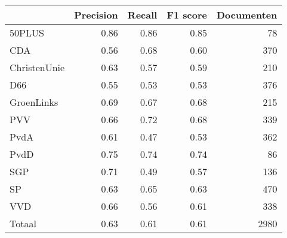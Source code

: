 \begin{tabular}{lrrrr}
\toprule
{} &  Precision &  Recall &  F1 score &  Documenten \\
\midrule
50PLUS       &       0.86 &    0.86 &      0.85 &          78 \\
CDA          &       0.56 &    0.68 &      0.60 &         370 \\
ChristenUnie &       0.63 &    0.57 &      0.59 &         210 \\
D66          &       0.55 &    0.53 &      0.53 &         376 \\
GroenLinks   &       0.69 &    0.67 &      0.68 &         215 \\
PVV          &       0.66 &    0.72 &      0.68 &         339 \\
PvdA         &       0.61 &    0.47 &      0.53 &         362 \\
PvdD         &       0.75 &    0.74 &      0.74 &          86 \\
SGP          &       0.71 &    0.49 &      0.57 &         136 \\
SP           &       0.63 &    0.65 &      0.63 &         470 \\
VVD          &       0.66 &    0.56 &      0.61 &         338 \\
Totaal       &       0.63 &    0.61 &      0.61 &        2980 \\
\bottomrule
\end{tabular}
